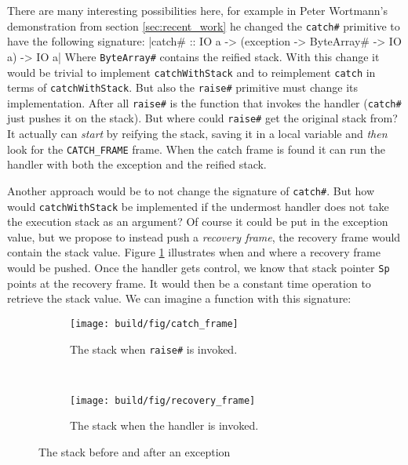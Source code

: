 There are many interesting possibilities here, for example in Peter
Wortmann's demonstration from section \ref{sec:recent_work} he changed the
\texttt{catch\#} primitive to have the following signature:
|catch# :: IO a -> (exception -> ByteArray# -> IO a) -> IO a|
Where \texttt{ByteArray\#} contains the reified stack. With this change
it would be trivial to implement \texttt{catchWithStack} and
to reimplement \texttt{catch} in terms of \texttt{catchWithStack}. But
also the \texttt{raise\#} primitive must change its implementation. After
all \texttt{raise\#} is the function that invokes the handler
(\texttt{catch\#} just pushes it on the stack). But where could
\texttt{raise\#} get the original stack from? It actually can \emph{start} by
reifying the stack, saving it in a local variable and \emph{then} look
for the \texttt{CATCH\_FRAME} frame. When the catch frame is found it
can run the handler with both the exception and the reified stack.

Another approach would be to not change the signature of
\texttt{catch\#}. But how would \texttt{catchWithStack} be implemented if
the undermost handler does not take the execution stack as an argument?
Of course it could be put in the exception value, but we propose to
instead push a \emph{recovery frame}, the recovery frame would contain
the stack value. Figure \ref{fig:recovery_frame} illustrates when and
where a recovery frame would be pushed. Once the handler
gets control, we know that stack pointer \texttt{Sp} points
at the recovery frame. It would then be a constant time operation to
retrieve the stack value. We can imagine a function with this
signature:

\begin{figure}
\begin{mdframed}
  \begin{subfigure}[t]{0.5\textwidth}
    \texttt{[image: build/fig/catch\_frame]}
    \caption{The stack when \texttt{raise\#} is invoked.}
  \end{subfigure}
        ~ %
  \begin{subfigure}[t]{0.5\textwidth}
    \texttt{[image: build/fig/recovery\_frame]}
    \caption{The stack when the handler is invoked.}
  \end{subfigure}
  \caption{The stack before and after an exception}
  \label{fig:recovery_frame}
\end{mdframed}
\end{figure}


